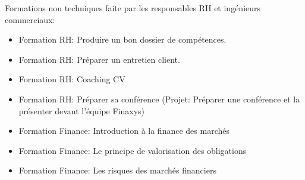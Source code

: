 Formations non techniques faite par les responsables RH et ingénieurs commerciaux:
\begin{itemize}  
    \item Formation RH: Produire un bon dossier de compétences.
    \item Formation RH: Préparer un entretien client.
    \item Formation RH: Coaching CV
    \item Formation RH: Préparer sa conférence (Projet: Préparer une conférence et la présenter devant l'équipe Finaxys)
    \item Formation Finance: Introduction à la finance des marchés
    \item Formation Finance: Le principe de valorisation des obligations
    \item Formation Finance: Les risques des marchés financiers
\end{itemize}